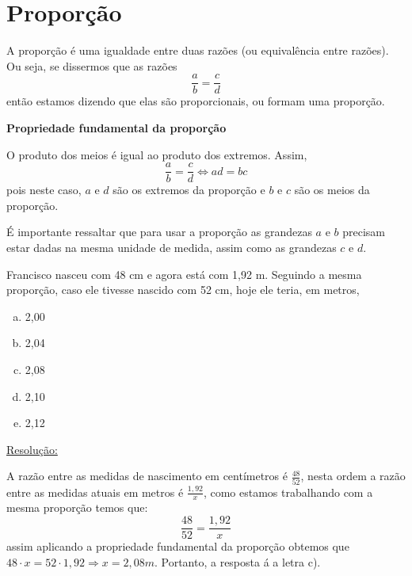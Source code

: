 \section{Proporção}

A proporção é uma igualdade entre duas razões (ou equivalência entre razões). Ou seja, se dissermos que as razões
\begin{equation}
\frac{a}{b}= \frac{c}{d}
\end{equation}
então estamos dizendo que elas são proporcionais, ou formam uma proporção.

\vskip0.3cm

\colorbox{azul}{
 \begin{minipage}{0.9\linewidth}
 \begin{center}
 \textbf{Propriedade fundamental da proporção}

   O produto dos meios é igual ao produto dos extremos. Assim,
\begin{equation}
\frac{a}{b}= \frac{c}{d} \Leftrightarrow ad= bc
\end{equation}
 pois neste caso, $a$ e $d$ são os extremos da proporção e $b$ e $c$ são os meios da proporção.
 \end{center}
 \end{minipage}}

 \vskip0.3cm

É importante ressaltar que para usar a proporção as grandezas $a$ e $b$ precisam estar dadas na mesma unidade de medida, assim como as grandezas $c$ e $d$.

\begin{exem}[VUNESP - 2012]
 Francisco nasceu com 48 cm e agora está com 1,92 m. Seguindo a mesma proporção, caso ele tivesse nascido com 52 cm, hoje ele teria, em metros,
 \begin{multicols}{5}
 \begin{enumerate}[a)]
  \item 2,00
  \item 2,04
  \item 2,08
  \item 2,10
  \item 2,12
 \end{enumerate}
 \end{multicols}

\underline{Resolução:}

A razão entre as medidas de nascimento em centímetros é $\frac{48}{52}$, nesta ordem a razão entre as medidas atuais em metros é $\frac{1,92}{x}$, como estamos trabalhando com a mesma proporção temos que:
\begin{equation}
\frac{48}{52} = \frac{1,92}{x}
\end{equation}
assim aplicando a propriedade fundamental da proporção obtemos que $48 \cdot x= 52 \cdot 1,92 \Rightarrow x= 2,08 m$. Portanto, a resposta á a letra c).

\fim
\end{exem}


